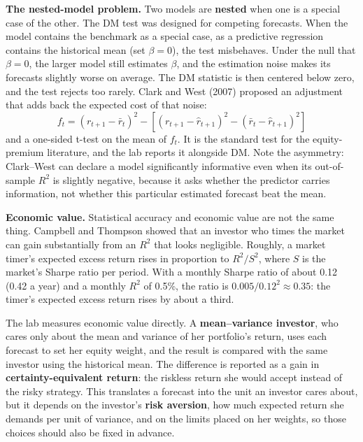 \textbf{The nested-model problem.} Two models are \textbf{nested} when one is a special case of the other. The DM test was designed for competing forecasts. When the model contains the benchmark as a special case, as a predictive regression contains the historical mean (set $\beta = 0$), the test misbehaves. Under the null that $\beta = 0$, the larger model still estimates $\beta$, and the estimation noise makes its forecasts slightly worse on average. The DM statistic is then centered below zero, and the test rejects too rarely. Clark and West (2007) proposed an adjustment that adds back the expected cost of that noise:
\begin{equation}
  f_t = (r_{t+1} - \bar r_t)^2 - \left[(r_{t+1} - \hat r_{t+1})^2 - (\bar r_t - \hat r_{t+1})^2\right]
  \label{eq:05-cw}
\end{equation}
and a one-sided t-test on the mean of $f_t$. It is the standard test for the equity-premium literature, and the lab reports it alongside DM. Note the asymmetry: Clark--West can declare a model significantly informative even when its out-of-sample $R^2$ is slightly negative, because it asks whether the predictor carries information, not whether this particular estimated forecast beat the mean.

\textbf{Economic value.} Statistical accuracy and economic value are not the same thing. Campbell and Thompson showed that an investor who times the market can gain substantially from an $R^2$ that looks negligible. Roughly, a market timer's expected excess return rises in proportion to $R^2/S^2$, where $S$ is the market's Sharpe ratio per period. With a monthly Sharpe ratio of about 0.12 (0.42 a year) and a monthly $R^2$ of 0.5\%, the ratio is $0.005/0.12^2 \approx 0.35$: the timer's expected excess return rises by about a third.

The lab measures economic value directly. A \textbf{mean--variance investor}, who cares only about the mean and variance of her portfolio's return, uses each forecast to set her equity weight, and the result is compared with the same investor using the historical mean. The difference is reported as a gain in \textbf{certainty-equivalent return}: the riskless return she would accept instead of the risky strategy. This translates a forecast into the unit an investor cares about, but it depends on the investor's \textbf{risk aversion}, how much expected return she demands per unit of variance, and on the limits placed on her weights, so those choices should also be fixed in advance.

